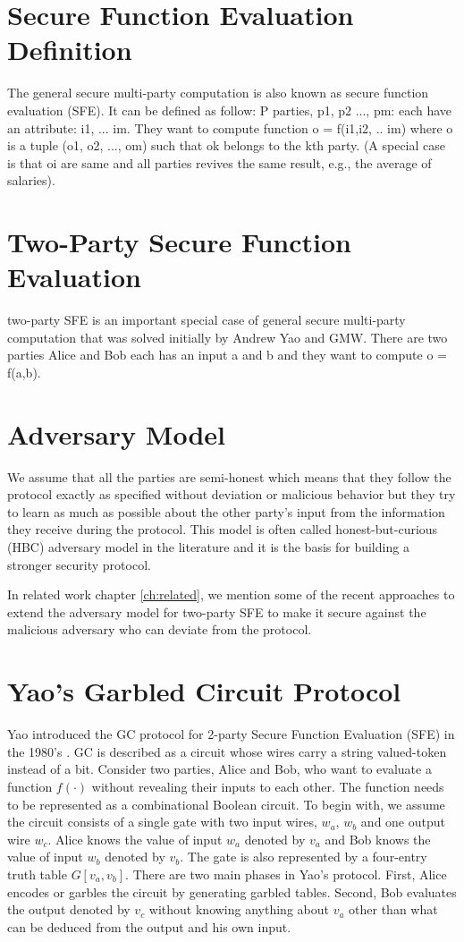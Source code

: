 \section{Secure Function Evaluation Definition}
The general secure multi-party computation is also known as secure function evaluation (SFE). It can be defined as follow: P parties, p1, p2 ..., pm: each have an attribute: i1, ... im. They want to compute function o = f(i1,i2, .. im) where o is a tuple (o1, o2, ..., om) such that ok belongs to the kth party. (A special case is that oi are same and all parties revives the same result, e.g., the average of salaries).

\section{Two-Party Secure Function Evaluation}
two-party SFE is an important special case of general secure multi-party computation that was solved initially by Andrew Yao and GMW.
There are two parties Alice and Bob each has an input a and b and they want to compute o = f(a,b).

\section{Adversary Model}
We assume that all the parties are semi-honest which means that they follow the protocol exactly as specified without deviation or malicious behavior but they try to learn as much as possible about the other party's input from the information they receive during the protocol.
This model is often called honest-but-curious (HBC) adversary model in the literature and it is the basis for building a stronger security protocol.

In related work chapter \ref{ch:related}, we mention some of the recent approaches to extend the adversary model for two-party SFE to make it secure against the malicious adversary who can deviate from the protocol.

\section{Yao's Garbled Circuit Protocol}
Yao introduced the GC protocol for 2-party Secure Function Evaluation (SFE) in the 1980's \cite{yao1986generate}.
GC is described as a circuit whose wires carry a string valued-token instead of a bit.
Consider two parties, Alice and Bob, who want to evaluate a function $f(\cdot)$ without revealing their inputs to each other.
The function needs to be represented as a combinational Boolean circuit.
To begin with, we assume the circuit consists of a single gate with two input wires, $w_{a}$, $w_{b}$ and one output wire $w_{c}$.
Alice knows the value of input $w_{a}$ denoted by $v_{a}$ and Bob knows the value of input $w_{b}$ denoted by $v_{b}$.
The gate is also represented by a four-entry truth table $G[v_{a}, v_{b}]$.
There are two main phases in Yao's protocol.
First, Alice encodes or garbles the circuit by generating garbled tables.
Second, Bob evaluates the output denoted by $v_{c}$ without knowing anything about $v_{a}$ other than what can be deduced from the output and his own input.

